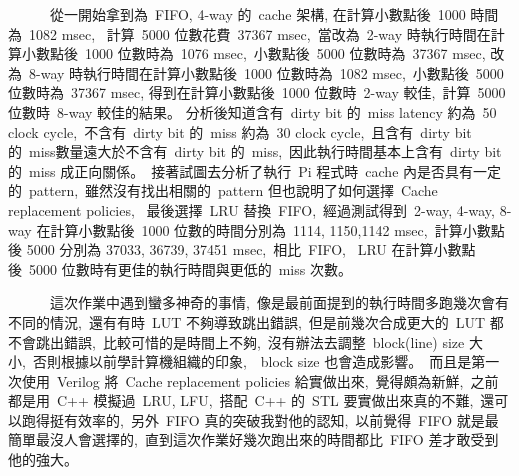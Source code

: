 \documentclass{article}
\begin{document}
\begin{CJK*}{UTF8}{bsmi}
\begin{multicols}{2}
\begin{flushleft}
    \ \ \ \ \ \ 從一開始拿到為\ FIFO, 4-way 的\ cache 架構, 在計算小數點後\ 1000 時間為\ 1082 msec, \
    計算\ 5000 位數花費\ 37367 msec,\
    當改為\ 2-way 時執行時間在計算小數點後\ 1000 位數時為\ 1076 msec,\
    小數點後\ 5000 位數時為\ 37367 msec,
    改為\ 8-way 時執行時間在計算小數點後\ 1000 位數時為\ 1082 msec,\
    小數點後\ 5000 位數時為\ 37367 msec,
    得到在計算小數點後\ 1000 位數時\ 2-way 較佳,\
    計算\ 5000 位數時\ 8-way 較佳的結果。
    分析後知道含有\ dirty bit 的\ miss latency 約為\ 50 clock cycle,\
    不含有\ dirty bit 的\ miss 約為\ 30 clock cycle,\
    且含有\ dirty bit 的\ miss數量遠大於不含有\ dirty bit 的\ miss,\
    因此執行時間基本上含有\ dirty bit 的\ miss 成正向關係。\
    接著試圖去分析了執行\ Pi 程式時\ cache 內是否具有一定的\ pattern,\
    雖然沒有找出相關的\ pattern 但也說明了如何選擇\ Cache replacement policies, \
    最後選擇\ LRU 替換\ FIFO,\
    經過測試得到\ 2-way, 4-way, 8-way 在計算小數點後\ 1000 位數的時間分別為\ 1114, 1150,1142 msec,\
    計算小數點後 5000 分別為 37033, 36739, 37451 msec,\
    相比\ FIFO, \ LRU 在計算小數點後\ 5000 位數時有更佳的執行時間與更低的\ miss 次數。\newline

    \ \ \ \ \ \ 這次作業中遇到蠻多神奇的事情,\
    像是最前面提到的執行時間多跑幾次會有不同的情況,\
    還有有時\ LUT 不夠導致跳出錯誤,\
    但是前幾次合成更大的\ LUT 都不會跳出錯誤,\
    比較可惜的是時間上不夠,\
    沒有辦法去調整\ block(line) size 大小,\
    否則根據以前學計算機組織的印象,\
    \ block size 也會造成影響。\
    而且是第一次使用\ Verilog 將\ Cache replacement policies 給實做出來,\
    覺得頗為新鮮,\
    之前都是用\ C++ 模擬過\ LRU, LFU,\ 
    搭配\ C++ 的\ STL 要實做出來真的不難,\
    還可以跑得挺有效率的,\
    另外\ FIFO 真的突破我對他的認知,\
    以前覺得\ FIFO 就是最簡單最沒人會選擇的,\
    直到這次作業好幾次跑出來的時間都比\ FIFO 差才敢受到他的強大。
\end{flushleft}


\end{multicols}


\end{CJK*}
\end{document}
